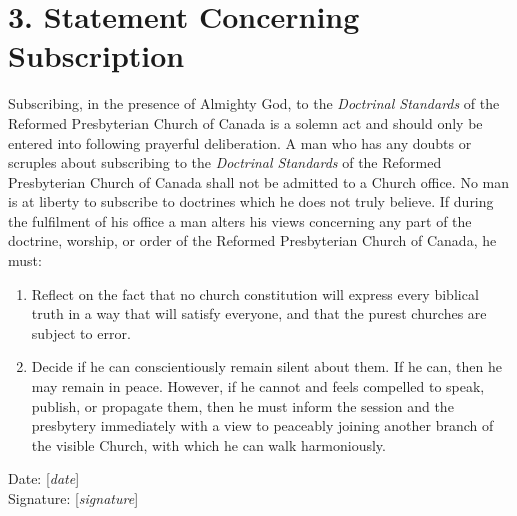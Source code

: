 \section[3. Statement Concerning Subscription]{3. Statement Concerning Subscription} 

Subscribing, in the presence of Almighty God, to the \textit{Doctrinal Standards} of the Reformed Presbyterian Church of Canada is a solemn act and should only be entered into following prayerful deliberation.   A man who has any doubts or scruples about subscribing to the \textit{Doctrinal Standards} of the Reformed Presbyterian Church of Canada shall not be admitted to a Church office. No man is at liberty to subscribe to doctrines which he does not truly believe.  If during the fulfilment of his office a man alters his views concerning any part of the doctrine, worship, or order of the Reformed Presbyterian Church of Canada, he must:

\begin{enumerate} 
  \item Reflect on the fact that no church constitution will express every biblical truth in a way that will satisfy everyone, and that the purest churches are subject to error. 
  \item Decide if he can conscientiously remain silent about them. If he can, then he may remain in peace. However, if he cannot and feels compelled to speak, publish, or propagate them, then he must inform the session and the presbytery immediately with a view to peaceably joining another branch of the visible Church, with which he can walk harmoniously.
\end{enumerate} 

\par Date: [\textit{date}]  
\\ Signature: [\textit{signature}] 


